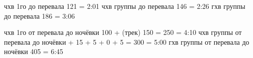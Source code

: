 





чхв 1го до перевала 121 = 2:01
чхв группы до перевала 146 = 2:26
гхв группы до перевала 186 = 3:06


чхв 1го от перевала до ночёвки 100 + (трек) 150 = 250 = 4:10
чхв группы от перевала до ночёвки + 15 + 5 + 0 + 5 = 300 = 5:00
гхв группы от перевала до ночёвки 405 = 6:45



    \FloatBarrier
